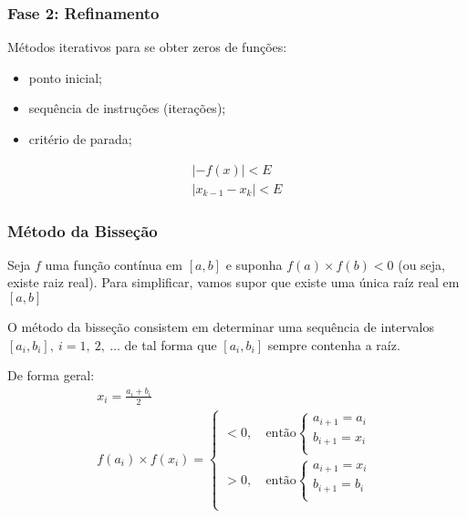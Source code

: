 \documentclass{article}
\begin{document}
        \subsubsection*{Fase 2: Refinamento}
        Métodos iterativos para se obter zeros de funções:
        \begin{itemize}
            \item ponto inicial;
            \item sequência de instruções (iterações);
            \item critério de parada;
        \end{itemize}

        \begin{gather*}
            |-f(x)| < E\\
            |x_{k-1} - x_k| < E
        \end{gather*}

        \subsubsection*{Método da Bisseção}
        Seja $f$ uma função contínua em $[a,b]$ e suponha $f(a) \times f(b) < 0$ (ou seja, existe raiz real).
        Para simplificar, vamos supor que existe uma única raíz real em $[a,b]$

        O método da bisseção consistem em determinar uma sequência de intervalos $[a_i,b_i],~i = 1,~2,~\ldots$ de tal forma que $[a_i,b_i]$ sempre contenha a raíz.


        De forma geral:
        \begin{gather*}
            x_i = \frac{a_i + b_i}{2}\\
            f(a_i) \times f(x_i) =
                \begin{cases}
                    < 0,~ & \text{então}
                        \begin{cases}
                            a_{i+1} = a_i\\
                            b_{i+1} = x_i\\
                        \end{cases}\\
                    > 0,~ & \text{então}
                        \begin{cases}
                            a_{i+1} = x_i\\
                            b_{i+1} = b_i\\
                        \end{cases}\\
                \end{cases}\\
        \end{gather*}
\end{document}
